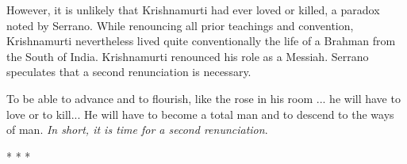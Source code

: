 However, it is unlikely that Krishnamurti had ever loved or killed, a paradox noted by Serrano. While renouncing all prior teachings and convention, Krishnamurti nevertheless lived quite conventionally the life of a Brahman from the South of India. Krishnamurti renounced his role as a Messiah. Serrano speculates that a second renunciation is necessary.

\begin{quotex}
To be able to advance and to flourish, like the rose in his room ... he will have to love or to kill... He will have to become a total man and to descend to the ways of man. \emph{In short, it is time for a second renunciation}.
\end{quotex}




\begin{center}* * *\end{center}

